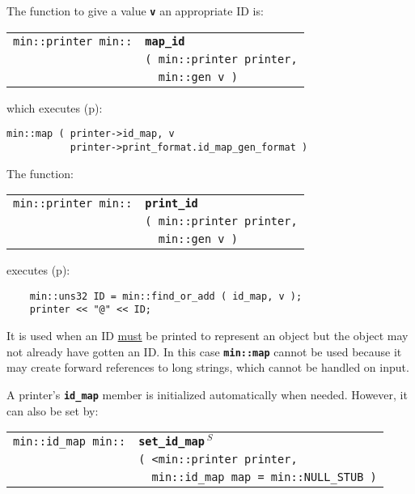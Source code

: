 \documentclass[12pt]{article}
\makeatletter
\newcommand{\TT}[1]{{\tt \bfseries #1}}
\newcommand{\ttindex}[1]{\index{#1@{\tt #1}}}
\newcommand{\pagref}[1]{p\pageref{#1}}
\newcommand{\EOL}{\penalty \exhyphenpenalty}
\newenvironment{indpar}[1][0.3in]%
	{\begin{list}{}%
		     {\setlength{\itemsep}{0in}%
		      \setlength{\topsep}{0in}%
		      \setlength{\parsep}{1ex}%
		      \setlength{\labelwidth}{#1}%
		      \setlength{\leftmargin}{#1}%
		      \addtolength{\leftmargin}{\labelsep}}%
	 \item}%
	{\end{list}}
\newcommand{\LABEL}[1]{\label{#1}}
\newlength{\ARGBREAKLENGTH}
\newcommand{\ARGBREAK}[1][\ARGBREAKLENGTH]{\\&\hspace*{#1}}
\newcommand{\MINKEY}[1]%
	   {\TT{#1}\ttindex{min::#1}\ttindex{#1}}
\newcommand{\RESIZE}{$\,^S$}
\makeatother
\begin{document}
The function to give a value \TT{v} an appropriate ID is:

\begin{indpar}[1em]\begin{tabular}{r@{}l}
\verb|min::printer min::| & \MINKEY{map\_id}\ARGBREAK
    \verb|( min::printer printer,|\ARGBREAK
    \verb|  min::gen v )|
\LABEL{MIN::MAP_ID} \\
\end{tabular}\end{indpar}

which executes (\pagref{MIN::MAP_OF_ID_MAP}):
\begin{indpar}
\verb|min::map ( printer->id_map, v| \\
\verb|           printer->print_format.id_map_gen_format )|
\end{indpar}

The function:

\begin{indpar}[1em]\begin{tabular}{r@{}l}
\verb|min::printer min::| & \MINKEY{print\_id}\ARGBREAK
    \verb|( min::printer printer,|\ARGBREAK
    \verb|  min::gen v )|
\LABEL{MIN::PRINT_ID} \\
\end{tabular}\end{indpar}

executes (\pagref{MIN::FIND_OR_ADD_OF_ID_MAP}):

\begin{indpar}\begin{verbatim}
    min::uns32 ID = min::find_or_add ( id_map, v );
    printer << "@" << ID;
\end{verbatim}\end{indpar}

It is used when an ID \underline{must} be printed
to represent an object but the object may not already have gotten
an ID.  In this case \TT{min::map} cannot be used because it may
create forward references to long strings, which cannot be handled
on input.

A printer's \TT{id\_map} member is initialized automatically when
needed.  However, it can also be set by:

\begin{indpar}[1em]\begin{tabular}{r@{}l}
\verb|min::id_map min::|
    & \MINKEY{set\_\EOL id\_\EOL map\RESIZE}\ARGBREAK
    \verb|( <min::printer printer,|\ARGBREAK
    \verb|  min::id_map map = min::NULL_STUB )|
\LABEL{MIN::SET_ID_MAP_OF_PRINTER} \\
\end{tabular}\end{indpar}
\end{document}
